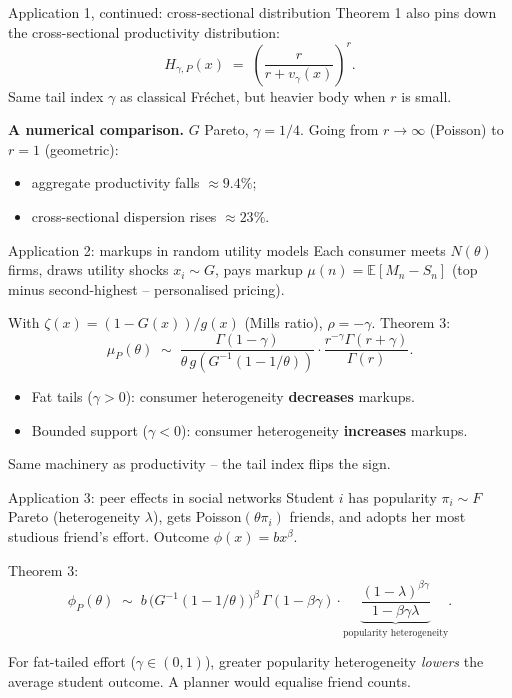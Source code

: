 \documentclass[aspectratio=169,xcolor=dvipsnames]{beamer}
\begin{document}
\begin{frame}{Application 1, continued: cross-sectional distribution}
    Theorem 1 also pins down the cross-sectional productivity distribution:
    \[
        H_{\gamma,P}(x) \;=\; \left(\frac{r}{r+v_\gamma(x)}\right)^{\!r}.
    \]
    Same tail index $\gamma$ as classical Fr\'echet, but heavier body when $r$ is small.

    \vspace{3mm}
    \textbf{A numerical comparison.} $G$ Pareto, $\gamma=1/4$. Going from $r\to\infty$ (Poisson) to $r=1$ (geometric):
    \begin{itemize}
        \item aggregate productivity falls $\approx 9.4\%$;
        \item cross-sectional dispersion rises $\approx 23\%$.
    \end{itemize}
\end{frame}

\begin{frame}{Application 2: markups in random utility models}
    Each consumer meets $N(\theta)$ firms, draws utility shocks $x_i\sim G$, pays markup
    \(\mu(n) = \mathbb{E}[M_n - S_n]\) (top minus second-highest -- personalised pricing).

    \vspace{2mm}
    With $\zeta(x) = (1-G(x))/g(x)$ (Mills ratio), $\rho = -\gamma$. Theorem 3:
    \[
        \mu_P(\theta) \;\sim\; \frac{\Gamma(1-\gamma)}{\theta\,g(G^{-1}(1-1/\theta))}\cdot\frac{r^{-\gamma}\Gamma(r+\gamma)}{\Gamma(r)}.
    \]
    \vspace{1mm}
    \begin{itemize}
        \item Fat tails ($\gamma>0$): consumer heterogeneity \textbf{decreases} markups.
        \item Bounded support ($\gamma<0$): consumer heterogeneity \textbf{increases} markups.
    \end{itemize}
    \vspace{2mm}
    Same machinery as productivity -- the tail index flips the sign.
\end{frame}

\begin{frame}{Application 3: peer effects in social networks}
    Student $i$ has popularity $\pi_i\sim F$ Pareto (heterogeneity $\lambda$), gets Poisson$(\theta\pi_i)$ friends, and adopts her most studious friend's effort. Outcome $\phi(x)=bx^\beta$.

    \vspace{2mm}
    Theorem 3:
    \[
        \phi_P(\theta) \;\sim\; b\,\bigl(G^{-1}(1-1/\theta)\bigr)^\beta\,\Gamma(1-\beta\gamma)\cdot\underbrace{\frac{(1-\lambda)^{\beta\gamma}}{1-\beta\gamma\lambda}}_{\text{popularity heterogeneity}}.
    \]
    \vspace{1mm}

    For fat-tailed effort ($\gamma\in(0,1)$), greater popularity heterogeneity \emph{lowers} the average student outcome. A planner would equalise friend counts.
\end{frame}
\end{document}
